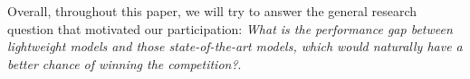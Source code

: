 \documentclass[11pt]{article}
\begin{document}
Overall, throughout this paper, we will try to answer the general research question that motivated our participation:
\textit{What is the performance gap between lightweight models and those state-of-the-art models, which would naturally have a better chance of winning the competition?}.



\end{document}
